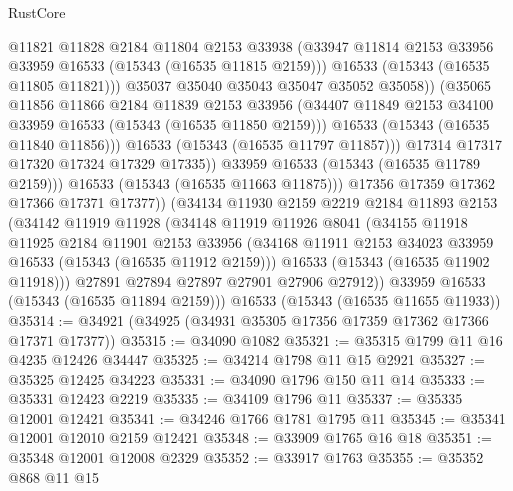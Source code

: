 \begin{lexlean}{RustCore}
\begin{coremodule}
                        @11821
                        @11828
                        @2184
                        @11804
                        @2153
                        @33938
                        (@33947 @11814 @2153 @33956 @33959 @16533 (@15343 (@16535 @11815 @2159)))
                        @16533
                        (@15343 (@16535 @11805 @11821)))
                      @35037
                      @35040
                      @35043
                      @35047
                      @35052
                      @35058))
                  (@35065
                    @11856
                    @11866
                    @2184
                    @11839
                    @2153
                    @33956
                    (@34407 @11849 @2153 @34100 @33959 @16533 (@15343 (@16535 @11850 @2159)))
                    @16533
                    (@15343 (@16535 @11840 @11856)))
                  @16533
                  (@15343 (@16535 @11797 @11857)))
                @17314
                @17317
                @17320
                @17324
                @17329
                @17335))
            @33959
            @16533
            (@15343 (@16535 @11789 @2159)))
          @16533
          (@15343 (@16535 @11663 @11875)))
        @17356
        @17359
        @17362
        @17366
        @17371
        @17377))
    (@34134
      @11930
      @2159
      @2219
      @2184
      @11893
      @2153
      (@34142
        @11919
        @11928
        (@34148
          @11919
          @11926
          @8041
          (@34155
            @11918
            @11925
            @2184
            @11901
            @2153
            @33956
            (@34168 @11911 @2153 @34023 @33959 @16533 (@15343 (@16535 @11912 @2159)))
            @16533
            (@15343 (@16535 @11902 @11918)))
          @27891
          @27894
          @27897
          @27901
          @27906
          @27912))
      @33959
      @16533
      (@15343 (@16535 @11894 @2159)))
    @16533
    (@15343 (@16535 @11655 @11933))
@35314 := @34921 (@34925 (@34931 @35305 @17356 @17359 @17362 @17366 @17371 @17377))
@35315 := @34090 @1082
@35321 := @35315 @1799 @11 @16 @4235 @12426 @34447
@35325 := @34214 @1798 @11 @15 @2921
@35327 := @35325 @12425 @34223
@35331 := @34090 @1796 @150 @11 @14
@35333 := @35331 @12423 @2219
@35335 := @34109 @1796 @11
@35337 := @35335 @12001 @12421
@35341 := @34246 @1766 @1781 @1795 @11
@35345 := @35341 @12001 @12010 @2159 @12421
@35348 := @33909 @1765 @16 @18
@35351 := @35348 @12001 @12008 @2329
@35352 := @33917 @1763
@35355 := @35352 @868 @11 @15

\end{coremodule}
\end{lexlean}
